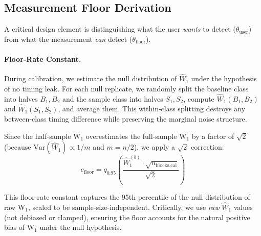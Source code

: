\documentclass[letterpaper,twocolumn,10pt]{article}
\begin{document}
\subsection{Measurement Floor Derivation}
\label{app:floor}

A critical design element is distinguishing what the user \emph{wants} to detect ($\theta_{\text{user}}$) from what the measurement \emph{can} detect ($\theta_{\text{floor}}$).

\paragraph{Floor-Rate Constant.}
During calibration, we estimate the null distribution of $\widehat{W}_1$ under the hypothesis of no
timing leak. For each null replicate, we randomly split the baseline class into halves $B_1, B_2$
and the sample class into halves $S_1, S_2$, compute $\widehat{W}_1(B_1, B_2)$ and
$\widehat{W}_1(S_1, S_2)$, and average them. This within-class splitting destroys any
between-class timing difference while preserving the marginal noise structure.

Since the half-sample W$_1$ overestimates the full-sample W$_1$ by a factor of $\sqrt{2}$
(because $\text{Var}(\widehat{W}_1) \propto 1/m$ and $m = n/2$), we apply a $\sqrt{2}$ correction:
\begin{equation}
c_{\text{floor}} = q_{0.95}\!\left(\frac{\widehat{W}_1^{(b)} \cdot \sqrt{n_{\text{blocks,cal}}}}{\sqrt{2}}\right)
\end{equation}

This floor-rate constant captures the 95th percentile of the null distribution of raw W$_1$, scaled to
be sample-size-independent. Critically, we use \emph{raw} $\widehat{W}_1$ values (not debiased or
clamped), ensuring the floor accounts for the natural positive bias of W$_1$ under the null hypothesis.
\end{document}
